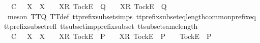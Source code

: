 \begin{isabellebody}
\ {\isachardoublequoteopen}{\isasymrho}{\isacharprime}\ {\isasymsubseteq}\isactrlsub C\ {\isasymrho}{\isacharprime}{\isacharprime}\ {\isasymLongrightarrow}\ X\ {\isasymsubseteq}\ X{\isacharprime}\ {\isasymLongrightarrow}\ {\isasymrho}{\isacharprime}{\isacharprime}\ {\isacharat}\ {\isacharbrackleft}{\isacharbrackleft}X{\isacharprime}{\isacharbrackright}\isactrlsub R{\isacharcomma}\ {\isacharbrackleft}Tock{\isacharbrackright}\isactrlsub E{\isacharbrackright}\ {\isasymin}\ Q\ {\isasymLongrightarrow}\ {\isasymrho}{\isacharprime}\ {\isacharat}\ {\isacharbrackleft}{\isacharbrackleft}X{\isacharbrackright}\isactrlsub R{\isacharcomma}\ {\isacharbrackleft}Tock{\isacharbrackright}\isactrlsub E{\isacharbrackright}\ {\isasymin}\ Q{\isachardoublequoteclose}\isanewline
\ \ \ \ \ \ \isamarkupfalse%
\ {\isacharparenleft}meson\ TT{}{\isacharunderscore}Q\ TT{}{\isacharunderscore}def\ tt{\isacharunderscore}prefix{\isacharunderscore}subset{\isachardot}simps{\isacharparenleft}{}{\isacharparenright}\ tt{\isacharunderscore}prefix{\isacharunderscore}subset{\isacharunderscore}eq{\isacharunderscore}length{\isacharunderscore}common{\isacharunderscore}prefix{\isacharunderscore}eq\ tt{\isacharunderscore}prefix{\isacharunderscore}subset{\isacharunderscore}refl\ tt{\isacharunderscore}subset{\isacharunderscore}imp{\isacharunderscore}prefix{\isacharunderscore}subset\ tt{\isacharunderscore}subset{\isacharunderscore}same{\isacharunderscore}length{\isacharparenright}\isanewline
\ \ \isamarkupfalse%
\isanewline
\ \ \ \ \isamarkupfalse%
\ {\isachardoublequoteopen}{\isasymrho}{\isacharprime}\ {\isasymsubseteq}\isactrlsub C\ {\isasymrho}{\isacharprime}{\isacharprime}\ {\isasymLongrightarrow}\ X\ {\isasymsubseteq}\ X{\isacharprime}\ {\isasymLongrightarrow}\ {\isasymrho}{\isacharprime}{\isacharprime}\ {\isacharat}\ {\isacharbrackleft}{\isacharbrackleft}X{\isacharprime}{\isacharbrackright}\isactrlsub R{\isacharcomma}\ {\isacharbrackleft}Tock{\isacharbrackright}\isactrlsub E{\isacharbrackright}\ {\isasymin}\ P\ {\isasymLongrightarrow}\ {\isasymrho}{\isacharprime}\ {\isacharat}\ {\isacharbrackleft}{\isacharbrackleft}X{\isacharbrackright}\isactrlsub R{\isacharcomma}\ {\isacharbrackleft}Tock{\isacharbrackright}\isactrlsub E{\isacharbrackright}\ {\isasymnotin}\ P\ {\isasymLongrightarrow}\ {\isasymrho}{\isacharprime}\ {\isacharat}\ {\isacharbrackleft}{\isacharbrackleft}Tock{\isacharbrackright}\isactrlsub E{\isacharbrackright}\ {\isasymin}\ P{\isachardoublequoteclose}\isanewline
\ \ \ \ \ \ \isamarkupfalse%

\end{isabellebody}

